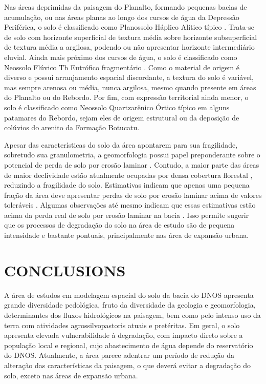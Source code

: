 Nas áreas deprimidas da paisagem do Planalto, formando pequenas bacias de acumulação, ou nas áreas planas ao 
longo dos cursos de água da Depressão Periférica, o solo é classificado como Planossolo Háplico Alítico típico 
\cite{Miguel2010}. Trata-se de solo com horizonte superficial de textura média sobre horizonte subsuperficial 
de textura média a argilosa, podendo ou não apresentar horizonte intermediário eluvial. Ainda mais próximo dos 
cursos de água, o solo é classificado como Neossolo Flúvico Tb Eutrófico fragmentário \cite{Miguel2010}. Como 
o material de origem é diverso e possui arranjamento espacial discordante, a textura do solo é variável, mas 
sempre arenosa ou média, nunca argilosa, mesmo quando presente em áreas do Planalto ou do Rebordo. Por fim, 
com expressão territorial ainda menor, o solo é classificado como Neossolo Quartzarênico Órtico típico em 
alguns patamares do Rebordo, sejam eles de origem estrutural ou da deposição de colúvios do arenito da 
Formação 
Botucatu.

Apesar das características do solo da área apontarem para sua fragilidade, sobretudo sua granulometria, a 
geomorfologia possui papel preponderante sobre o potencial de perda de solo por erosão laminar 
\cite{Miguel2010}. Contudo, a maior parte das áreas de maior declividade estão atualmente ocupadas por densa 
cobertura florestal \cite{SamuelRosaEtAl2011a}, reduzindo a fragilidade do solo. Estimativas indicam que 
apenas 
uma pequena fração da área deve apresentar perdas de solo por erosão laminar acima de valores toleráveis 
\cite{Miguel2010}. Algumas observações até mesmo indicam que essas estimativas estão acima da perda real de 
solo por erosão laminar na bacia \cite{Branco1998, MouraBueno2012}. Isso permite sugerir que os processos de 
degradação do solo na área de estudo são de pequena intensidade e bastante pontuais, principalmente nas área 
de expansão urbana.

\section{CONCLUSIONS}

A área de estudos em modelagem espacial do solo da bacia do DNOS apresenta grande diversidade pedológica, 
fruto da diversidade da geologia e geomorfologia, determinantes dos fluxos hidrológicos na paisagem, bem como 
pelo intenso uso da terra com atividades agrossilvopastoris atuais e pretéritas. Em geral, o solo apresenta 
elevada vulnerabilidade à degradação, com impacto direto sobre a população local e regional, cujo 
abastecimento de água depende do reservatório do DNOS. Atualmente, a área parece adentrar um período de 
redução 
da alteração das características da paisagem, o que deverá evitar a degradação do solo, exceto nas áreas de 
expansão urbana.

